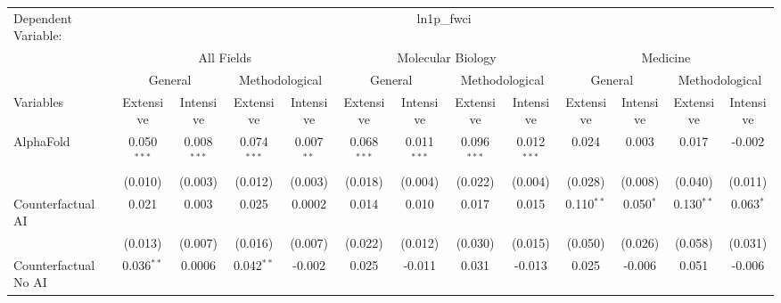 \begingroup
\centering
\begin{tabular}{lcccccccccccc}
   \tabularnewline \midrule \midrule
   Dependent Variable: & \multicolumn{12}{c}{ln1p\_fwci}\\
 & \multicolumn{4}{c}{All Fields} & \multicolumn{4}{c}{Molecular Biology} & \multicolumn{4}{c}{Medicine} \\
\cmidrule(lr){2-5} \cmidrule(lr){6-9} \cmidrule(lr){10-13}
 & \multicolumn{2}{c}{General} & \multicolumn{2}{c}{Methodological} & \multicolumn{2}{c}{General} & \multicolumn{2}{c}{Methodological} & \multicolumn{2}{c}{General} & \multicolumn{2}{c}{Methodological} \\
\cmidrule(lr){2-3} \cmidrule(lr){4-5} \cmidrule(lr){6-7} \cmidrule(lr){8-9} \cmidrule(lr){10-11} \cmidrule(lr){12-13}
Variables & \multicolumn{1}{c}{Extensive} & \multicolumn{1}{c}{Intensive} & \multicolumn{1}{c}{Extensive} & \multicolumn{1}{c}{Intensive} & \multicolumn{1}{c}{Extensive} & \multicolumn{1}{c}{Intensive} & \multicolumn{1}{c}{Extensive} & \multicolumn{1}{c}{Intensive} & \multicolumn{1}{c}{Extensive} & \multicolumn{1}{c}{Intensive} & \multicolumn{1}{c}{Extensive} & \multicolumn{1}{c}{Intensive} \\
\cmidrule(lr){1-1}\cmidrule(lr){2-2} \cmidrule(lr){3-3} \cmidrule(lr){4-4} \cmidrule(lr){5-5} \cmidrule(lr){6-6} \cmidrule(lr){7-7} \cmidrule(lr){8-8} \cmidrule(lr){9-9} \cmidrule(lr){10-10} \cmidrule(lr){11-11} \cmidrule(lr){12-12} \cmidrule(lr){13-13}
   AlphaFold                                & 0.050$^{***}$ & 0.008$^{***}$  & 0.074$^{***}$ & 0.007$^{**}$   & 0.068$^{***}$ & 0.011$^{***}$ & 0.096$^{***}$ & 0.012$^{***}$ & 0.024        & 0.003       & 0.017        & -0.002\\   
                                            & (0.010)       & (0.003)        & (0.012)       & (0.003)        & (0.018)       & (0.004)       & (0.022)       & (0.004)       & (0.028)      & (0.008)     & (0.040)      & (0.011)\\   
   Counterfactual AI                        & 0.021         & 0.003          & 0.025         & 0.0002         & 0.014         & 0.010         & 0.017         & 0.015         & 0.110$^{**}$ & 0.050$^{*}$ & 0.130$^{**}$ & 0.063$^{*}$\\   
                                            & (0.013)       & (0.007)        & (0.016)       & (0.007)        & (0.022)       & (0.012)       & (0.030)       & (0.015)       & (0.050)      & (0.026)     & (0.058)      & (0.031)\\   
   Counterfactual No AI                     & 0.036$^{**}$  & 0.0006         & 0.042$^{**}$  & -0.002         & 0.025         & -0.011        & 0.031         & -0.013        & 0.025        & -0.006      & 0.051        & -0.006\\   

\end{tabular}
